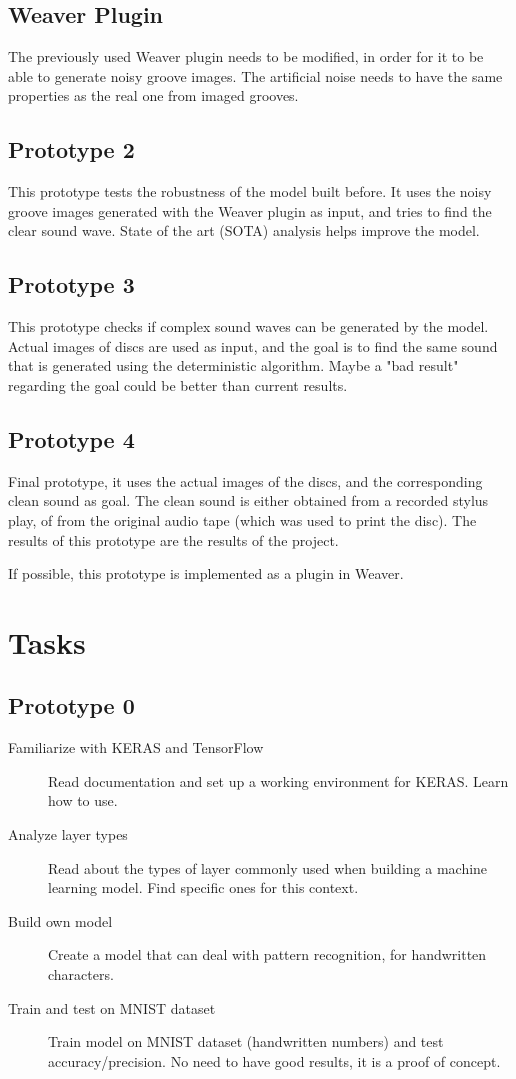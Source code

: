 \documentclass[12pt, twoside]{article}
\begin{document}
\subsection{Weaver Plugin}
The previously used Weaver plugin needs to be modified, in order for it to be able to generate noisy groove images. The artificial noise needs to have the same properties as the real one from imaged grooves.
\subsection{Prototype 2}
This prototype tests the robustness of the model built before. It uses the noisy groove images generated with the Weaver plugin as input, and tries to find the clear sound wave. State of the art (SOTA) analysis helps improve the model.
\subsection{Prototype 3}
This prototype checks if complex sound waves can be generated by the model. Actual images of discs are used as input, and the goal is to find the same sound that is generated using the deterministic algorithm. Maybe a "bad result" regarding the goal could be better than current results.
\subsection{Prototype 4}
Final prototype, it uses the actual images of the discs, and the corresponding clean sound as goal. The clean sound is either obtained from a recorded stylus play, of from the original audio tape (which was used to print the disc). The results of this prototype are the results of the project.

If possible, this prototype is implemented as a plugin in Weaver.  
\section{Tasks}
\subsection{Prototype 0}
\begin{description}
	\item[Familiarize with KERAS and TensorFlow] Read documentation and set up a working environment for KERAS. Learn how to use.
	 \item[Analyze layer types] Read about the types of layer commonly used when building a machine learning model. Find specific ones for this context.
	 \item[Build own model] Create a model that can deal with pattern recognition, for handwritten characters.
	 \item[Train and test on MNIST dataset] Train model on MNIST dataset (handwritten numbers) and test accuracy/precision. No need to have good results, it is a proof of concept.
\end{description}
\end{document}
